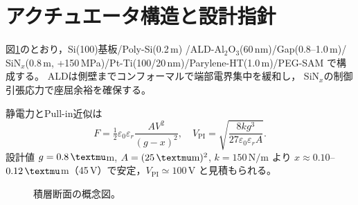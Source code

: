 \section{アクチュエータ構造と設計指針}
図\ref{fig:stack}のとおり，Si(100)基板/Poly-Si(0.2\,\textmu m)
/ALD-Al$_2$O$_3$(60\,nm)/Gap(0.8--1.0\,\textmu m)/
SiN$_x$(0.8\,\textmu m, +150\,MPa)/Pt-Ti(100/20\,nm)/Parylene-HT(1.0\,\textmu m)/PEG-SAM で構成する。
ALDは側壁までコンフォーマルで端部電界集中を緩和し，
SiN$_x$の制御引張応力で座屈余裕を確保する。

静電力とPull-in近似は
\begin{equation}
F=\tfrac{1}{2}\varepsilon_0\varepsilon_r \frac{A V^2}{(g-x)^2},\quad
V_{\mathrm{PI}}=\sqrt{\frac{8kg^3}{27\varepsilon_0\varepsilon_r A}}.
\end{equation}
設計値 $g=0.8\,\textmu$m, $A=(25\,\textmu\mathrm{m})^2$, $k=150\,\mathrm{N/m}$ より
$x\approx0.10$–$0.12\,\textmu$m（45\,V）で安定，$V_{\mathrm{PI}}\simeq100$\,V と見積もられる。

\begin{figure}[t]
\centering
{}
\caption{積層断面の概念図。}
\label{fig:stack}
\end{figure}
